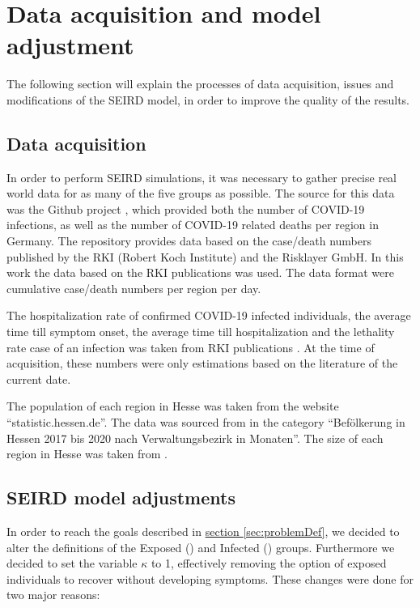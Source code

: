 \section{Data acquisition and model adjustment}
The following section will explain the processes of data acquisition, issues and modifications of the SEIRD model,
in order to improve the quality of the results.

\subsection{Data acquisition}
\label{sec:datacoll}
In order to perform SEIRD simulations, it was necessary to gather precise real world data for as many of the five groups as possible.
The source for this data was the Github project \cite{Gehrcke}, which provided both the number of COVID-19 infections,
as well as the number of COVID-19 related deaths per region in Germany. The repository provides data based on the case/death
numbers published by the RKI (Robert Koch Institute) and the Risklayer GmbH. In this work the data based on the RKI publications
was used. The data format were cumulative case/death numbers per region per day.\newline

\par
The hospitalization rate of confirmed COVID-19 infected individuals, the average time till symptom onset, the average time till
hospitalization and the lethality rate case of an infection was taken from RKI publications \cite{RKIcov}. At the time of acquisition, these
numbers were only estimations based on the literature of the current date.\newline

\par
The population of each region in Hesse was taken from the website ``statistic.hessen.de''. The data was sourced from \cite{HessePop}
in the category ``Bef\"olkerung in Hessen 2017 bis 2020 nach Verwaltungsbezirk in Monaten''. The size of each region in Hesse
was taken from \cite{HesseSize}.

\subsection{SEIRD model adjustments}
\label{sec:SEIRDredef}
In order to reach the goals described in \hyperref[sec:problemDef]{section \ref*{sec:problemDef}}, we decided to alter
the definitions of the Exposed () and Infected () groups. Furthermore we decided to set the variable
$\kappa$ to 1, effectively removing the option of exposed individuals to recover without developing symptoms. These
changes were done for two major reasons:\newline

